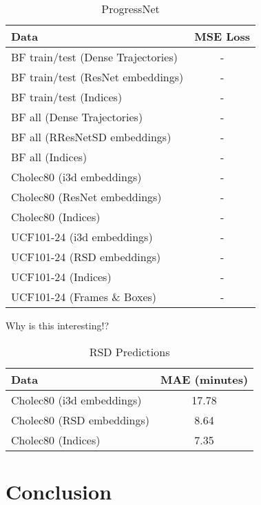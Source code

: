 \documentclass[10pt,twocolumn,letterpaper]{article}
\begin{document}
 \begin{table}
  \centering
  \begin{tabular}{@{}lc@{}}
    \toprule
    Data & MSE Loss \\
    \midrule
    BF train/test (Dense Trajectories) & - \\
    BF train/test (ResNet embeddings) & - \\
    BF train/test (Indices) & - \\

    BF all (Dense Trajectories) & - \\
    BF all (RResNetSD embeddings) & - \\
    BF all (Indices) & - \\

    \midrule
    Cholec80 (i3d embeddings) & - \\
    Cholec80 (ResNet embeddings) & - \\
    Cholec80 (Indices) & - \\

    \midrule
    UCF101-24 (i3d embeddings) & - \\
    UCF101-24 (RSD embeddings) & -\\
    UCF101-24 (Indices) & - \\

    \midrule
    UCF101-24 (Frames \& Boxes) & - \\

    \bottomrule
  \end{tabular}
  \caption{ProgressNet}
  \label{tab:progressnet}
\end{table}

Why is this interesting!?
\begin{table}
  \centering
  \begin{tabular}{@{}lc@{}}
    \toprule
    Data & MAE (minutes) \\
    \midrule
    Cholec80 (i3d embeddings) & 17.78 \\
    Cholec80 (RSD embeddings) & 8.64 \\
    Cholec80 (Indices) & 7.35 \\

    \bottomrule
  \end{tabular}
  \caption{RSD Predictions}
  \label{tab:rsd_values}
\end{table}

\section{Conclusion}
\label{sec:conclusion}

{\small


}
\end{document}
